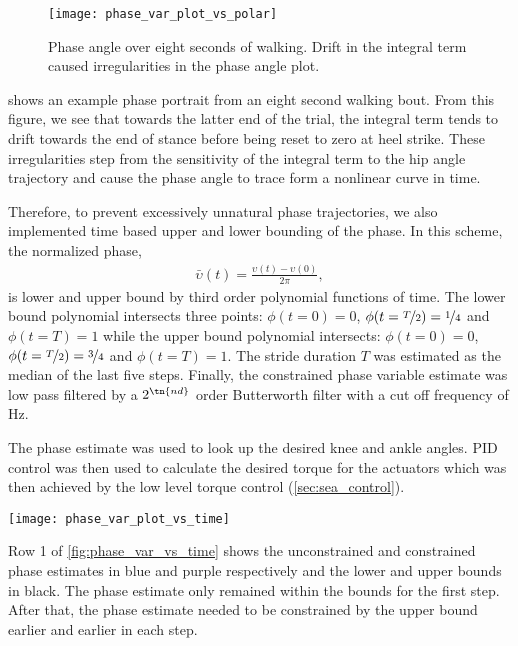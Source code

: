 \begin{figure}[t]
    \centering 
    \texttt{[image: phase\_var\_plot\_vs\_polar]}
    \caption[Phase angle over eight seconds of walking.]{Phase angle over eight
    seconds of walking. Drift in the integral term caused irregularities in the
    phase angle plot.}\label{fig:phase_var_polar}
\end{figure}
 shows an example phase portrait from an eight second
walking bout. From this figure, we see that towards the latter end of the trial,
the integral term tends to drift towards the end of stance before being reset to
zero at heel strike. These irregularities step from the sensitivity of the
integral term to the hip angle trajectory and cause the phase angle to trace
form a nonlinear curve in time.

Therefore, to prevent excessively unnatural phase trajectories, we also
implemented time based upper and lower bounding of the phase. In this scheme,
the normalized phase,
\begin{align}
    \bar \upsilon(t) = \frac{\upsilon(t) - \upsilon(0)}{2 \pi},
\end{align}
is lower and upper bound by third order polynomial functions of time. The lower
bound polynomial intersects three points: $\phi(t=0) = 0$,
$\phi(t=\nicefrac{T}{2}) = \nicefrac{1}{4}$ and $\phi(t = T) = 1$ while the
upper bound polynomial intersects: $\phi(t=0) = 0$,
$\phi(t=\nicefrac{T}{2}) = \nicefrac{3}{4}$ and $\phi(t = T) = 1$. The stride
duration $T$ was estimated as the median of the last five steps. Finally, the
constrained phase variable estimate was low pass filtered by a $2^\tn{nd}$ order
Butterworth filter with a cut off frequency of \unit[10]{Hz}.

The phase estimate was used to look up the desired knee and ankle angles. PID
control was then used to calculate the desired torque for the actuators which
was then achieved by the low level torque control (\cref{sec:sea_control}).

\begin{figure*}[t]
    \centering 
    \texttt{[image: phase\_var\_plot\_vs\_time]}
    \caption[Results from test of unified phase variable controller.]{Results
    from test of unified phase variable controller. Step to step variability
    causes significant divergence in the integral term, leading to an unstable
    phase estimate.}\label{fig:phase_var_vs_time}
\end{figure*}
Row 1 of \cref{fig:phase_var_vs_time} shows the unconstrained and constrained
phase estimates in blue and purple respectively and the lower and upper bounds
in black. The phase estimate only remained within the bounds for the first step.
After that, the phase estimate needed to be constrained by the upper bound
earlier and earlier in each step.

